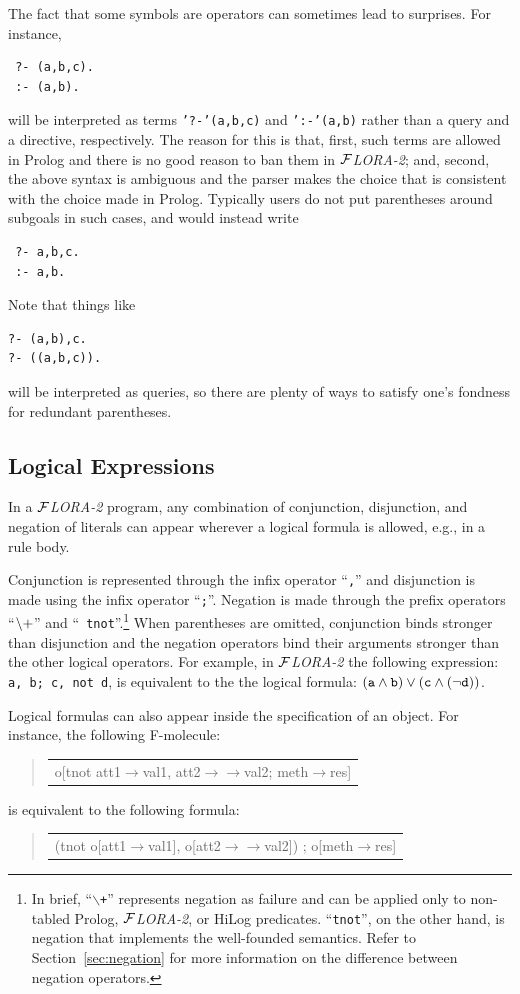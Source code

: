 \documentclass[11pt]{article}
\newenvironment{qrules}{\begin{quote}\tt\begin{tabular}[t]{l}}%
{\end{tabular}\end{quote}}
\newcommand{\fd}{\ensuremath{{\rightarrow}}}                   %
\newcommand{\mvd}{\ensuremath{{\rightarrow\!\!\!\!\rightarrow}}}  %
\newcommand{\FLORA}{{\mbox{${\cal F}${\small\it LORA}\rm\emph{-2}}}\xspace}
\newcommand{\NAF}{{$\tt\backslash +$}\xspace}
\begin{document}
The fact that some symbols are operators can sometimes lead to
surprises. For instance,
\begin{verbatim}
 ?- (a,b,c).
 :- (a,b).
\end{verbatim}
will be interpreted as terms {\tt '?-'(a,b,c)} and {\tt ':-'(a,b)} rather
than a query and a directive, respectively. The reason for this is that,
first, such terms are allowed in Prolog and there is no good reason to ban
them in \FLORA; and, second, the above syntax is ambiguous and the parser
makes the choice that is consistent with the choice made in
Prolog. Typically users do not put parentheses around subgoals in such
cases, and would instead write
\begin{verbatim}
 ?- a,b,c.
 :- a,b.  
\end{verbatim}
Note that things like
\begin{verbatim}
?- (a,b),c.  
?- ((a,b,c)).
\end{verbatim}
will be interpreted as queries, so there are plenty of ways to satisfy
one's fondness for redundant parentheses.


\subsection{Logical Expressions}


%
In a \FLORA program, any combination of conjunction, disjunction, and
negation of literals can appear wherever a logical formula is allowed,
e.g., in a rule body.

Conjunction is represented through the infix operator ``{\tt ,}'' and
disjunction is made using the infix operator ``{\tt ;}''.  Negation is made
through the prefix operators ``\NAF'' and ``{\tt
  tnot}''.\footnote{
  In brief, ``{\tt $\backslash$+}'' represents negation as
  failure and can be applied only to non-tabled Prolog, \FLORA, or HiLog
  predicates. ``{\tt tnot}'', on the other hand, is negation that
  implements the well-founded semantics.  Refer to
  Section~\ref{sec:negation} for more information on the difference between
  negation operators. 
  }
When parentheses are omitted, conjunction binds stronger than disjunction
and the negation operators bind their arguments stronger than the other
logical operators.  For example, in \FLORA the following expression:
\verb|a, b; c, not d|, is equivalent to the the logical formula: $\tt (a
\wedge b) \vee (c \wedge (\neg d))$.

%
Logical formulas can also appear inside the specification of an object. For
instance, the following F-molecule:
\begin{qrules}
o[tnot att1{\fd}val1, att2{\mvd}val2; meth{\fd}res]
\end{qrules}
is equivalent to the following formula:
\begin{qrules}
(tnot o[att1{\fd}val1], o[att2{\mvd}val2]) ; o[meth{\fd}res]
\end{qrules}
\end{document}
